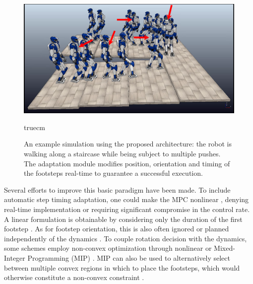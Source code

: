 \begin{figure}
    \centering
    \includegraphics[trim={0.5cm 1.5cm 2cm 0.1cm},clip,width=0.9\columnwidth]{figures/strobo-staircase-with-pushes.png}
    \caption{An example simulation using the proposed architecture: the robot is walking along a staircase while being subject to multiple pushes. The adaptation module modifies position, orientation and timing of the footsteps real-time to guarantee a successful execution.}
    \label{fig:FAPA:two-patches-mixed-integer-snapshots}
     truecm
\end{figure}



Several efforts to improve this basic paradigm have been made. To include automatic step timing adaptation, one could make the MPC nonlinear \cite{Maximo2020,Bohorquez2017,Caron2017,Aurelien2014}, denying real-time implementation or requiring significant compromise in the control rate. A linear formulation is obtainable by considering only the duration of the first footstep \cite{Smaldone2021FeasibilityDrivenSTA,Khadiv2020}. As for footstep orientation, this is also often ignored or planned independently of the dynamics \cite{HePeWi:10}. To couple rotation decision with the dynamics, some schemes employ non-convex optimization through nonlinear \cite{Naveau2017,Bohorquez2018} or Mixed-Integer Programming (MIP) \cite{Maximo2020}. MIP can also be used to alternatively select between multiple convex regions in which to place the footsteps, which would otherwise constitute a non-convex constraint \cite{Aceituno2018,DeTe:14}.

